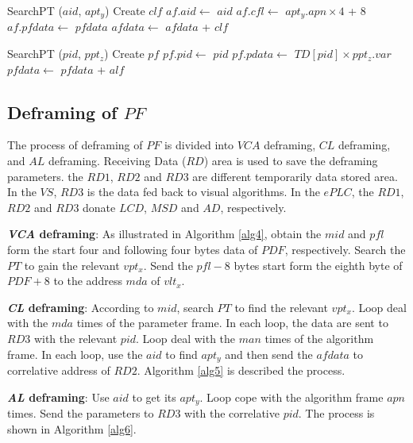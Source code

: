 \documentclass[journal,UTF8]{IEEEtran}
\begin{document}
\begin{algorithm}
	\label{alg2}
	\caption{$CLFraming$}%
	SearchPT ($aid$, $apt_y$)\;
	Create $clf$\;
	$af.aid\leftarrow$ $aid$\;
	$af.cfl \leftarrow$ $apt_y.apn \times 4$ + 8\;
	$af.pfdata \leftarrow$ $pfdata$\;	
	$afdata\leftarrow$ $afdata$ + $clf$\;	 
\end{algorithm}
\begin{algorithm}
	\label{alg3}
	\caption{$ALFraming$}%
	SearchPT ($pid$, $ppt_z$)\;
	Create $pf$\;
	$pf.pid\leftarrow$ $pid$\; %
	$pf.pdata \leftarrow$ $TD[pid]\times ppt_z.var$\;
	$pfdata\leftarrow$ $pfdata$ + $alf$\;	 
\end{algorithm}

\subsection{Deframing of $PF$}
 The process of deframing of $PF$ is divided into $VCA$ deframing, $CL$ deframing, and $AL$ deframing. Receiving Data ($RD$) area is used to save the deframing parameters. the $RD1$, $RD2$ and $RD3$ are different temporarily data stored area. In the $VS$, $RD3$ is the data fed back to visual algorithms. In the $ePLC$, the $RD1$, $RD2$ and $RD3$ donate $LCD$, $MSD$ and $AD$, respectively.

\textbf{\emph{VCA} deframing}: As illustrated in Algorithm \ref{alg4}, obtain the $mid$ and $pfl$ form the start four and following four bytes data of $PDF$, respectively. Search the $PT$ to gain the relevant $vpt_x$. Send the $pfl-8$ bytes start form the eighth byte of $PDF+8$ to the address $mda$ of $vlt_x$.

\textbf{\emph{CL} deframing}: According to $mid$, search $PT$ to find the relevant $vpt_x$. Loop deal with the $mda$ times of the parameter frame. In each loop, the data are sent to $RD3$ with the relevant $pid$. Loop deal with the $man$ times of the algorithm frame. In each loop, use the $aid$ to find $apt_y$ and then send the $afdata$ to correlative address of $RD2$. Algorithm \ref{alg5} is described the process.

\textbf{\emph{AL} deframing}: Use $aid$ to get its $apt_y$. Loop cope with the algorithm frame $apn$ times. Send the parameters to $RD3$ with the correlative $pid$. The process is shown in Algorithm \ref{alg6}.
\end{document}
